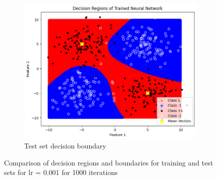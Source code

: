 \documentclass[a4paper,12pt]{article}
\begin{document}
\begin{figure}[H]
    \begin{subfigure}{0.45\textwidth}
        \centering
        \includegraphics[width=\textwidth]{3.3_.001_1000_Test.png}
        \caption{Test set decision boundary}
    \end{subfigure}

    \caption{Comparison of decision regions and boundaries for training and test sets for lr = 0.001 for 1000 iterations}
\end{figure}
\end{document}
